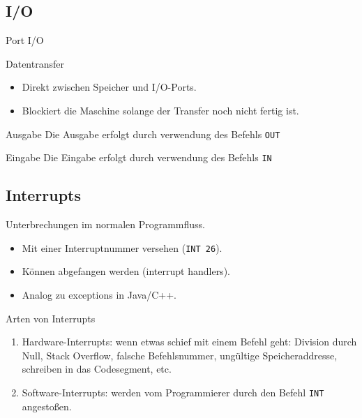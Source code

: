 \subsection{I/O}

\begin{frame}{Port I/O}
   \begin{center}
  
 \end{center}
\end{frame}


\begin{frame}{Datentransfer}
 \begin{itemize}
   \item Direkt zwischen Speicher und I/O-Ports.
   \item Blockiert die Maschine solange der Transfer noch nicht fertig ist.
 \end{itemize}
\end{frame}


\begin{frame}{Ausgabe}
 Die Ausgabe erfolgt durch verwendung des Befehls \texttt{OUT}
 \begin{center}
  
 \end{center}
\end{frame}


\begin{frame}{Eingabe}
 Die Eingabe erfolgt durch verwendung des Befehls \texttt{IN}
 \begin{center}
  
 \end{center}
\end{frame}


\subsection{Interrupts}

\begin{frame}{\insertsubsection}
 Unterbrechungen im normalen Programmfluss.
 \begin{itemize}
   \item Mit einer Interruptnummer versehen (\texttt{INT 26}).
   \item Können abgefangen werden (interrupt handlers).
   \item Analog zu \glqq exceptions\grqq{} in Java/C++.
 \end{itemize}
\end{frame}



\begin{frame}{Arten von Interrupts}
 \begin{enumerate}
  \item Hardware-Interrupts: wenn etwas schief mit einem Befehl geht:
        Division durch Null, Stack Overflow, falsche Befehlsnummer, ungültige
        Speicheraddresse, schreiben in das Codesegment, etc.
  \item Software-Interrupts: werden vom Programmierer durch den Befehl 
        \texttt{INT} angestoßen.
 \end{enumerate}
\end{frame}



